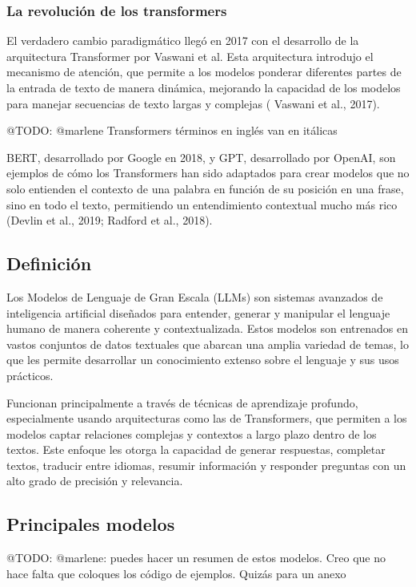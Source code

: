 \subsubsection*{La revolución de los transformers}
El verdadero cambio paradigmático llegó en 2017 con el desarrollo de la arquitectura
Transformer por Vaswani et al.
Esta arquitectura introdujo el mecanismo de atención, que permite a los modelos ponderar diferentes partes de la entrada
de texto de manera dinámica, mejorando la capacidad de los modelos para manejar secuencias de texto largas y complejas (
Vaswani et al., 2017).

\colorbox{color_highlight}{@TODO: @marlene Transformers términos en inglés van en itálicas}

BERT, desarrollado por Google en 2018, y GPT, desarrollado por OpenAI, son ejemplos de
cómo los Transformers han sido adaptados para crear modelos que
no solo entienden el contexto de una palabra en función de su posición en una frase, sino en todo
el texto, permitiendo un entendimiento contextual mucho más rico (Devlin et al., 2019; Radford et al., 2018).

\subsection{Definición}
Los Modelos de Lenguaje de Gran Escala (LLMs) son sistemas
avanzados de inteligencia artificial diseñados para entender, generar y
manipular el lenguaje humano de manera coherente y contextualizada. Estos
modelos son entrenados en vastos conjuntos de datos textuales que abarcan una amplia variedad de temas, lo que les
permite desarrollar un conocimiento extenso sobre el lenguaje y sus usos prácticos.

Funcionan principalmente a través de técnicas de aprendizaje
profundo, especialmente usando arquitecturas como las de Transformers,
que permiten a los modelos captar relaciones complejas y contextos a largo plazo dentro de los textos. Este enfoque les
otorga la capacidad de generar respuestas, completar textos,
traducir entre idiomas, resumir información y responder preguntas con un alto grado de precisión y relevancia.

\subsection{Principales modelos}

\colorbox{color_highlight}
{@TODO: @marlene: puedes hacer un resumen de estos modelos. Creo que no hace falta que coloques los código de ejemplos.
Quizás
para un anexo}

